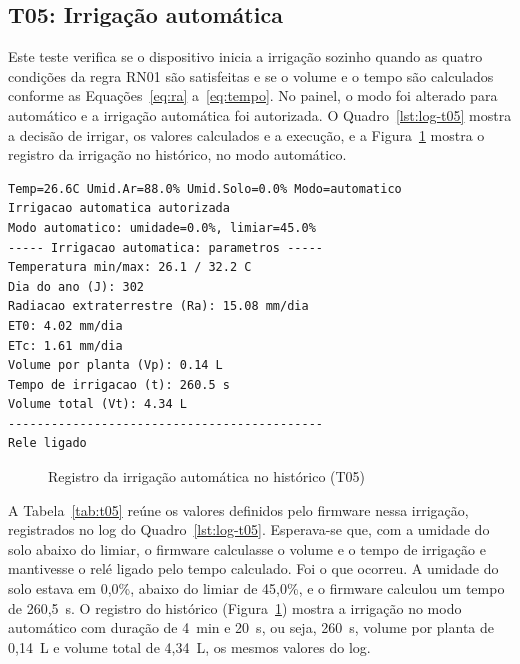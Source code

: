 \subsection{T05: Irrigação automática}

Este teste verifica se o dispositivo inicia a irrigação sozinho quando as quatro condições da regra RN01 são satisfeitas e se o volume e o tempo são calculados conforme as Equações~\ref{eq:ra} a~\ref{eq:tempo}. No painel, o modo foi alterado para automático e a irrigação automática foi autorizada. O Quadro~\ref{lst:log-t05} mostra a decisão de irrigar, os valores calculados e a execução, e a Figura~\ref{fig:t05-historico} mostra o registro da irrigação no histórico, no modo automático.

\vspace{0.6\baselineskip}
\noindent\begin{minipage}{\linewidth}
\begin{lstlisting}[language={}, caption={Log do monitor serial durante a irrigação automática (T05)}, label={lst:log-t05}]
Temp=26.6C Umid.Ar=88.0% Umid.Solo=0.0% Modo=automatico
Irrigacao automatica autorizada
Modo automatico: umidade=0.0%, limiar=45.0%
----- Irrigacao automatica: parametros -----
Temperatura min/max: 26.1 / 32.2 C
Dia do ano (J): 302
Radiacao extraterrestre (Ra): 15.08 mm/dia
ET0: 4.02 mm/dia
ETc: 1.61 mm/dia
Volume por planta (Vp): 0.14 L
Tempo de irrigacao (t): 260.5 s
Volume total (Vt): 4.34 L
--------------------------------------------
Rele ligado
\end{lstlisting}
\vspace{-0.5\baselineskip}
\end{minipage}
\medskip

\begin{figure}[htbp]
  \centering
  \caption{Registro da irrigação automática no histórico (T05)}
  \label{fig:t05-historico}
\end{figure}

A Tabela~\ref{tab:t05} reúne os valores definidos pelo firmware nessa irrigação, registrados no log do Quadro~\ref{lst:log-t05}. Esperava-se que, com a umidade do solo abaixo do limiar, o firmware calculasse o volume e o tempo de irrigação e mantivesse o relé ligado pelo tempo calculado. Foi o que ocorreu. A umidade do solo estava em 0,0\%, abaixo do limiar de 45,0\%, e o firmware calculou um tempo de 260,5~s. O registro do histórico (Figura~\ref{fig:t05-historico}) mostra a irrigação no modo automático com duração de 4~min e 20~s, ou seja, 260~s, volume por planta de 0,14~L e volume total de 4,34~L, os mesmos valores do log.

